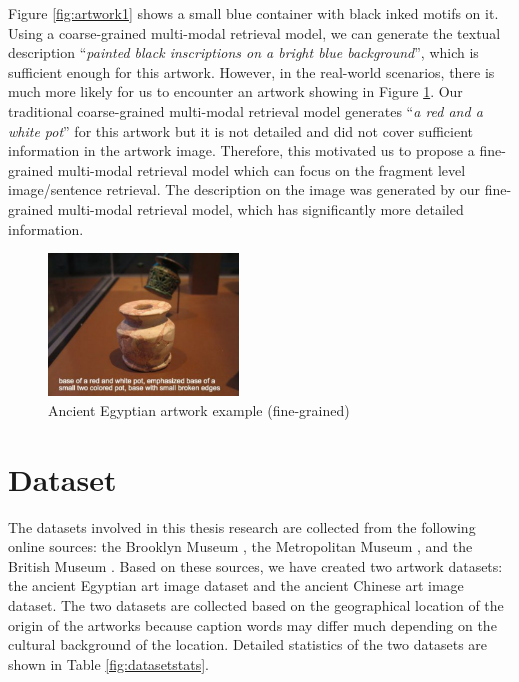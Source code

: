 Figure \ref{fig:artwork1} shows a small blue container with black inked motifs on it. Using a coarse-grained multi-modal retrieval model, we can generate the textual description ``\textit{painted black inscriptions on a bright blue background}'', which is sufficient enough for this artwork. However, in the real-world scenarios, there is much more likely for us to encounter an artwork showing in Figure \ref{fig:artwork2}. Our traditional coarse-grained multi-modal retrieval model generates ``\textit{a red and a white pot}'' for this artwork but it is not detailed and did not cover sufficient information in the artwork image. Therefore, this motivated us to propose a fine-grained multi-modal retrieval model which can focus on the fragment level image/sentence retrieval. The description on the image was generated by our fine-grained multi-modal retrieval model, which has significantly more detailed information.

\begin{figure}[h!]
\centering
\includegraphics[width=0.45\textwidth]{artwork_fine2.pdf}
\caption{Ancient Egyptian artwork example (fine-grained)}
\label{fig:artwork2}
\end{figure}

\section{Dataset}


The datasets involved in this thesis research are collected from the following online sources: the Brooklyn Museum \cite{brooklynmuseum}, the Metropolitan Museum \cite{themet}, and the British Museum \cite{thebritishmuseum}. Based on these sources, we have created two artwork datasets: the ancient Egyptian art image dataset and the ancient Chinese art image dataset. The two datasets are collected based on the geographical location of the origin of the artworks because caption words may differ much depending on the cultural background of the location. Detailed statistics of the two datasets are shown in Table \ref{fig:datasetstats}. 

